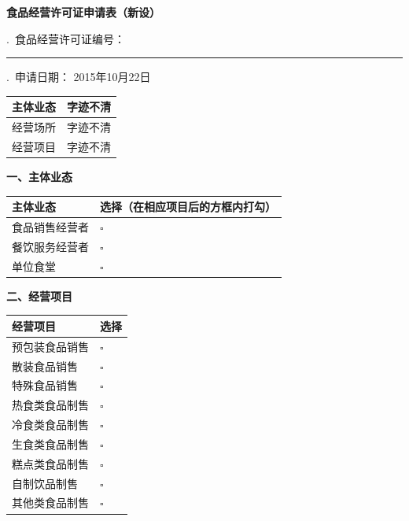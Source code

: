\documentclass[UTF8,10pt,a4paper,fontset=fandol]{ctexart}
\newcommand{\fieldvalue}[1]{#1}
\newcommand{\handwritten}[1]{#1}
\begin{document}
\vspace{1ex}

\noindent
\textbf{食品经营许可证申请表（新设）}

.\ 食品经营许可证编号：\rule{0.55\textwidth}{0.4pt}

.\ 申请日期：
\fieldvalue{\handwritten{2015年10月22日}}

\vspace{1ex}

\noindent
\begin{tabularx}{\textwidth}{|l|X|}
\hline
主体业态 &
\fieldvalue{\handwritten{字迹不清}}\\
\hline
经营场所 &
\fieldvalue{\handwritten{字迹不清}}\\
\hline
经营项目 &
\fieldvalue{\handwritten{字迹不清}}\\
\hline
\end{tabularx}

\vspace{1ex}

\noindent
\textbf{一、主体业态}

\begin{tabularx}{\textwidth}{|l|X|}
\hline
主体业态 & 选择（在相应项目后的方框内打勾）\\
\hline
食品销售经营者 & $\square$\\
\hline
餐饮服务经营者 & $\square$\\
\hline
单位食堂 & $\square$\\
\hline
\end{tabularx}

\vspace{1ex}

\noindent
\textbf{二、经营项目}

\begin{tabularx}{\textwidth}{|l|X|}
\hline
经营项目 & 选择\\
\hline
预包装食品销售 & $\square$\\
\hline
散装食品销售 & $\square$\\
\hline
特殊食品销售 & $\square$\\
\hline
热食类食品制售 & $\square$\\
\hline
冷食类食品制售 & $\square$\\
\hline
生食类食品制售 & $\square$\\
\hline
糕点类食品制售 & $\square$\\
\hline
自制饮品制售 & $\square$\\
\hline
其他类食品制售 & $\square$\\
\hline
\end{tabularx}
\end{document}
